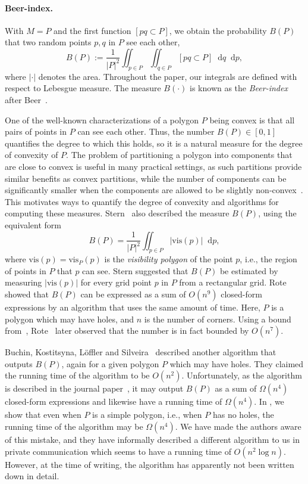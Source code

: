 \documentclass{article}
\newcommand*\diff{\mathop{}\!\mathrm{d}}
\newcommand{\vis}{\textrm{vis}}
\newcommand{\mydef}{:=}
\begin{document}
\paragraph{Beer-index.}
With $M=P$ and the first function $[pq\subset P]$, we obtain the probability $B(P)$ that two random points $p,q$ in $P$ see each other,
\[
B(P)\mydef \frac 1{\vert P\vert^2}
\iint_{p\in P}\iint_{q\in P} [pq\subset P]\diff q\diff p,
\]
where $\vert \cdot\vert$ denotes the area.
Throughout the paper, our integrals are defined with respect to Lebesgue measure.
The measure $B(\cdot)$ is known as the \emph{Beer-index} after Beer~\cite{beer1973index}.

One of the well-known characterizations of a polygon $P$ being convex is that all pairs of points in $P$ can see each other.
Thus, the number $B(P)\in[0,1]$ quantifies the degree to which this holds, so it is a natural measure for the degree of convexity of $P$.
The problem of partitioning a polygon into components that are close to convex is useful in many practical settings, as such partitions provide similar benefits as convex partitions, while the number of components can be significantly smaller when the components are allowed to be slightly non-convex~\cite{DBLP:journals/cad/GhoshALL13,DBLP:journals/comgeo/LienA06}.
This motivates ways to quantify the degree of convexity and algorithms for computing these measures.
Stern~\cite{DBLP:journals/prl/Stern89} also described the measure $B(P)$, using the equivalent form
\[
B(P)= \frac 1{\vert P\vert^2} \iint_{p\in P} \left\vert \vis(p) \right\vert \diff p,
\]
where $\vis(p)=\vis_P(p)$ is the \emph{visibility polygon} of the point $p$, i.e., the region of points in $P$ that $p$ can see.
Stern suggested that $B(P)$ be estimated by measuring $\vert \vis(p) \vert$ for every grid point $p$ in $P$ from a rectangular grid.
Rote~\cite{r-dc-13} showed that $B(P)$ can be expressed as a sum of $O(n^9)$ closed-form expressions by an algorithm that uses the same amount of time.
Here, $P$ is a polygon which may have holes, and $n$ is the number of corners.
Using a bound from~\cite{DBLP:books/daglib/0086218}, Rote~\cite{rote2017note} later observed that the number is in fact bounded by $O(n^7)$.

Buchin, Kostitsyna, L{\"{o}}ffler and Silveira~\cite{DBLP:journals/algorithmica/BuchinKLS19} described another algorithm that outputs $B(P)$, again for a given polygon $P$ which may have holes.
They claimed the running time of the algorithm to be $O(n^2)$.
Unfortunately, as the algorithm is described in the journal paper~\cite{DBLP:journals/algorithmica/BuchinKLS19}, it may output $B(P)$ as a sum of $\Omega(n^4)$ closed-form expressions and likewise have a running time of $\Omega(n^4)$.
In , we show that even when $P$ is a simple polygon, i.e., when $P$ has no holes, the running time of the algorithm may be $\Omega(n^4)$.
We have made the authors aware of this mistake, and they have informally described a different algorithm to us in private communication which seems to have a running time of $O(n^2\log n)$.
However, at the time of writing, the algorithm has apparently not been written down in detail.
\end{document}
